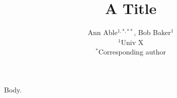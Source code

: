 \documentclass{article}
\title{A Title}
\author{Ann Able$^{1,*,**}$, Bob Baker$^{1}$\\ $^1$Univ X\\ $^{*}$Corresponding author}
\begin{document}
\maketitle
Body.
\end{document}
